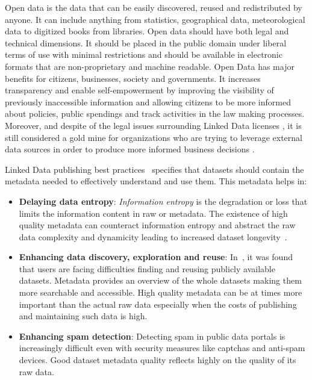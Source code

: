 \documentclass[runningheads,a4paper]{llncs}
\begin{document}
Open data is the data that can be easily discovered, reused and redistributed by anyone. It can include anything from statistics, geographical data, meteorological data to digitized books from libraries. Open data should have both legal and technical dimensions. It should be placed in the public domain under liberal terms of use with minimal restrictions and should be available in electronic formats that are non-proprietary and machine readable. Open Data has major benefits for citizens, businesses, society and governments. It increases transparency and enable self-empowerment by improving the visibility of previously inaccessible information and allowing citizens to be more informed about policies, public spendings and track activities in the law making processes. Moreover, and despite of the legal issues surrounding Linked Data licenses \cite{nomoneyLOD}, it is still considered a gold mine for organizations who are trying to leverage external data sources in order to produce more informed business decisions \cite{Boyd2011}.

Linked Data publishing best practices~\cite{Bizer:2011:EWG:2075914.2075915} specifies that datasets should contain the metadata needed to effectively understand and use them. This metadata helps in:

\begin{itemize}
  \item \textbf{Delaying data entropy}: \textit{Information entropy} is the degradation or loss that limits the information content in raw or metadata. The existence of high quality metadata can counteract information entropy and abstract the raw data complexity and dynamicity leading to  increased dataset longevity~\cite{GTOS}.
  \item \textbf{Enhancing data discovery, exploration and reuse}: In~\cite{Graham:11:}, it was found that users are facing difficulties finding and reusing publicly available datasets. Metadata provides an overview of the whole datasets making them more searchable and accessible. High quality metadata can be at times more important than the actual raw data especially when the costs of publishing and maintaining such data is high.
  \item \textbf{Enhancing spam detection}: Detecting spam in public data portals is increasingly difficult  even with security measures like captchas and anti-spam devices. Good dataset metadata quality reflects highly on the quality of its raw data.
\end{itemize}
\end{document}
